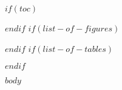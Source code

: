 \documentclass[$fontsize$,a4paper,oneside]{article}
\date{$date$}
\title{\myTitle}
\author{\myName}
\theoremstyle{definition}
\theoremstyle{plain}
\begin{document}
\pagestyle{headings}
\maketitle
$if(toc)$
\setcounter{tocdepth}{$toc-depth$}
\tableofcontents
\markboth{\contentsname}{\contentsname} 
$endif$
$if(list-of-figures)$ 
{}
\listoffigures
$endif$
$if(list-of-tables)$
{}
\listoftables
$endif$

$body$
\printbibliography
\end{document}

